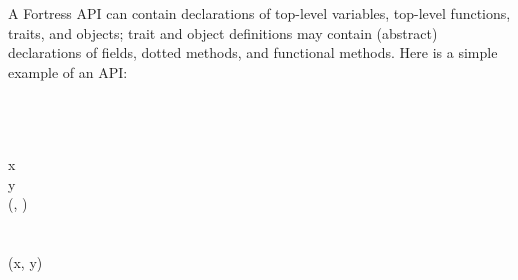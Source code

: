 A Fortress API can contain declarations of top-level variables,
top-level functions, traits, and objects; trait and object
definitions may contain (abstract) declarations of fields,
dotted methods, and functional methods.  Here is a simple example
of an API:
\begin{codeexamplesize}
\begin{FortressCode}
\:  \\
 \\
  \\
\2\+x\COLON {} \\
  y\COLON {} \\
  (, \COLON {})\COLON {}\- \\
 \\
 \\
(x\COLON {}, y\COLON {})\COLON {} \\
 \\
 
\end{FortressCode}
\end{codeexamplesize}

